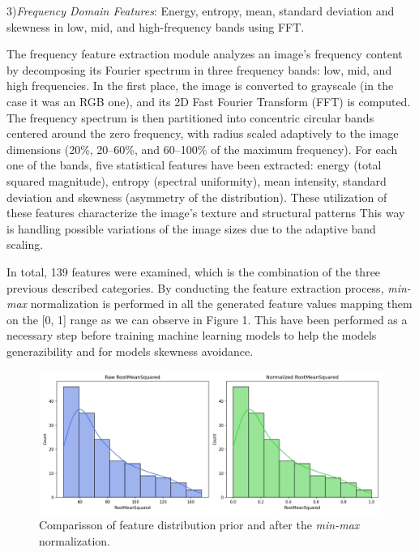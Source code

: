 \documentclass[11pt,a4paper]{article}
\begin{document}
	3)\textit{Frequency Domain Features}: Energy, entropy, mean, standard deviation and skewness in low, mid, and high-frequency 
	bands using FFT.
	
	The frequency feature extraction module analyzes an image's frequency content 
	by decomposing its Fourier spectrum in three frequency bands: low, mid, and high frequencies. 
	In the first place, the image is converted to grayscale (in the case it was an RGB one), 
	and its 2D Fast Fourier Transform (FFT) is computed. 
	The frequency spectrum is then partitioned into concentric circular bands 
	centered around the zero frequency, with radius scaled adaptively to the image 
	dimensions (20\%, 20–60\%, and 60–100\% of the maximum frequency). 
	For each one of the bands, five statistical features have been extracted:
	energy (total squared magnitude), entropy (spectral uniformity), mean intensity, standard deviation
	and skewness (asymmetry of the distribution). 
	These utilization of these features characterize the image's texture and structural patterns 
	This way is handling possible variations of the image sizes due to the adaptive band scaling.
	
	In total, 139 features were examined, which is the combination of the three previous described categories.
	By conducting the feature extraction process, \textit{min-max} normalization is performed in all the generated feature values
	mapping them on the [0, 1] range as we can observe in Figure 1. This have been performed as a necessary step
	before training machine learning models to help the models generazibility and for models skewness avoidance.

		\begin{figure}[h]
			\centering
			\includegraphics[width=1.1\textwidth]{images/RootMeanSquared.png}
			\caption{Comparisson of feature distribution prior and after the \textit{min-max} normalization.}
			\label{fig1:}
		\end{figure}		
\end{document}

